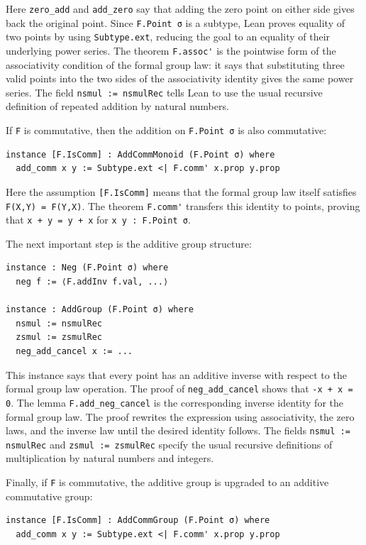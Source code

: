 Here \lstinline|zero_add| and \lstinline|add_zero| say that adding the
zero point on either side gives back the original point.  Since
\lstinline|F.Point σ| is a subtype, Lean proves equality of two points by
using \lstinline|Subtype.ext|, reducing the goal to an equality of their
underlying power series.  The theorem \lstinline|F.assoc'| is the
pointwise form of the associativity condition of the formal group law: it
says that substituting three valid points into the two sides of the
associativity identity gives the same power series.  The field
\lstinline|nsmul := nsmulRec| tells Lean to use the usual recursive
definition of repeated addition by natural numbers.

If \lstinline|F| is commutative, then the addition on
\lstinline|F.Point σ| is also commutative:
\begin{lstlisting}
instance [F.IsComm] : AddCommMonoid (F.Point σ) where
  add_comm x y := Subtype.ext <| F.comm' x.prop y.prop
\end{lstlisting}

Here the assumption \lstinline|[F.IsComm]| means that the formal group law
itself satisfies \lstinline|F(X,Y) = F(Y,X)|.  The theorem
\lstinline|F.comm'| transfers this identity to points, proving that
\lstinline|x + y = y + x| for \lstinline|x y : F.Point σ|.

The next important step is the additive group structure:
\begin{lstlisting}
instance : Neg (F.Point σ) where
  neg f := ⟨F.addInv f.val, ...⟩

instance : AddGroup (F.Point σ) where
  nsmul := nsmulRec
  zsmul := zsmulRec
  neg_add_cancel x := ...
\end{lstlisting}

This instance says that every point has an additive inverse with respect
to the formal group law operation.  The proof of
\lstinline|neg_add_cancel| shows that \lstinline|-x + x = 0|.  The lemma
\lstinline|F.add_neg_cancel| is the corresponding inverse identity for
the formal group law.  The proof rewrites the expression using
associativity, the zero laws, and the inverse law until the desired
identity follows.  The fields \lstinline|nsmul := nsmulRec| and
\lstinline|zsmul := zsmulRec| specify the usual recursive definitions of
multiplication by natural numbers and integers.

Finally, if \lstinline|F| is commutative, the additive group is upgraded
to an additive commutative group:
\begin{lstlisting}
instance [F.IsComm] : AddCommGroup (F.Point σ) where
  add_comm x y := Subtype.ext <| F.comm' x.prop y.prop
\end{lstlisting}

